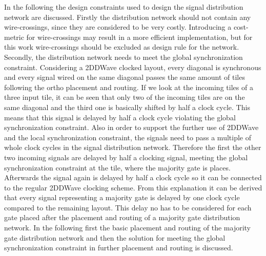 In the following the design constraints used to design the signal distribution network are discussed. Firstly the distribution network should not contain any wire-crossings, since they are considered to be very costly. Introducing a cost-metric for wire-crossings may result in a more efficient implementation, but for this work wire-crossings should be excluded as design rule for the network. Secondly, the distribution network needs to meet the global synchronization constraint. Considering a 2DDWave clocked layout, every diagonal is synchronous and every signal wired on the same diagonal passes the same amount of tiles following the ortho placement and routing. If we look at the incoming tiles of a three input tile, it can be seen that only two of the incoming tiles are on the same diagonal and the third one is basically shifted by half a clock cycle. This means that this signal is delayed by half a clock cycle violating the global synchronization constraint. Also in order to support the further use of 2DDWave and the local synchronization constraint, the signals need to pass a multiple of whole clock cycles in the signal distribution network. Therefore the first the other two incoming signals are delayed by half a clocking signal, meeting the global synchronization constraint at the tile, where the majority gate is places. Afterwards the signal again is delayed by half a clock cycle so it can be connected to the regular 2DDWave clocking scheme. From this explanation it can be derived that every signal representing a majority gate is delayed by one clock cycle compared to the remaining layout. This delay no has to be considered for each gate placed after the placement and routing of a majority gate distribution network. In the following first the basic placement and routing of the majority gate distribution network and then the solution for meeting the global synchronization constraint in further placement and routing is discussed. 

